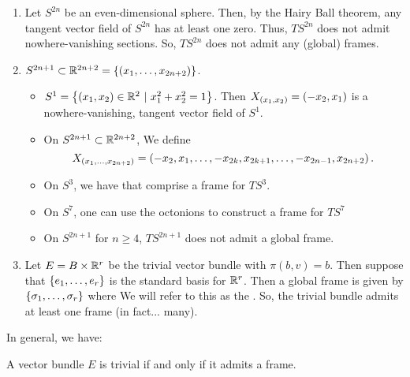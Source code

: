 \documentclass[main.tex]{subfiles}
\begin{document}
 \begin{exmp}
 \begin{enumerate}[1)]
     \item Let $S^{2n}$ be an even-dimensional sphere. Then, by the Hairy Ball theorem, any tangent vector field of $S^{2n}$ has at least one zero. Thus, $TS^{2n}$ does not admit nowhere-vanishing sections. So, $TS^{2n}$ does not admit any (global) frames.
     \item $S^{2n+1} \subset \mathbb{R}^{2n+2} = \left\{ \left( x_1, \dots, x_{2n+2}  \right)\right\}$.
     \begin{itemize}
         \item $S^1 = \left\{(x_1, x_2) \in \mathbb{R}^2 \ | \  x_1^2 + x_2^2 = 1\right\}$. Then $X_{\left( x_1, x_2 \right)} = (-x_2, x_1)$ is a nowhere-vanishing, tangent vector field of $S^1$.
         \item On $S^{2n+1} \subset \mathbb{R}^{2n+2}$, We define
         \[
         X_{\left( x_1, \dots, x_{2n+2} \right)} = \left(  -x_2, x_1, \dots, -x_{2k}, x_{2k+1}, \dots, -x_{2n-1}, x_{2n+2} \right).
         \]
         \item On $S^3$, we have that
          comprise a frame for $TS^3$.
         \item On $S^7$, one can use the octonions to construct a frame for $TS^7$
         \item On $S^{2n+1}$ for $n \geq 4$, $TS^{2n+1}$ does not admit a global frame.
     \end{itemize}
     \item Let $E = B \times \mathbb{R}^r$ be the trivial vector bundle with $\pi(b, v) = b$. Then suppose that $\left\{e_1, \dots, e_r\right\}$ is the standard basis for $\mathbb{R}^r$. Then a global frame is given by $\left\{\sigma_1, \dots, \sigma_r\right\}$ where
      We will refer to this as the . So, the trivial bundle admits at least one frame (in fact... many).
 \end{enumerate}
 \end{exmp}

 In general, we have:

 \begin{prop}
 A vector bundle $E$ is trivial if and only if it admits a frame.
 \end{prop}
\end{document}
